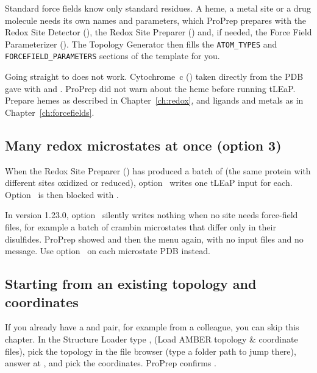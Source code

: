 Standard force fields know only standard residues. A heme, a metal site or a
drug molecule needs its own names and parameters, which ProPrep prepares with
the Redox Site Detector (), the Redox Site Preparer () and,
if needed, the Force Field Parameterizer (). The Topology Generator
then fills the \texttt{ATOM\_TYPES} and \texttt{FORCEFIELD\_PARAMETERS}
sections of the template for you.

Going straight to  does not work. Cytochrome~c () taken
directly from the PDB gave  with
 and . ProPrep did not warn
about the heme before running tLEaP. Prepare hemes as described in
Chapter~\ref{ch:redox}, and ligands and metals as in
Chapter~\ref{ch:forcefields}.

\subsection{Many redox microstates at once (option 3)}

When the Redox Site Preparer () has produced a batch of
 (the same protein with different sites oxidized or
reduced), option~ writes one tLEaP input for each. Option~ is
then blocked with .

\begin{watchout}
In version 1.23.0, option~ silently writes nothing when no site needs
force-field files, for example a batch of crambin microstates that differ only
in their disulfides. ProPrep showed 
and then the menu again, with no input files and no message. Use option~
on each microstate PDB instead.
\end{watchout}

\subsection{Starting from an existing topology and coordinates}

If you already have a  and  pair, for example from a
colleague, you can skip this chapter. In the Structure Loader type ,
 (Load AMBER topology \& coordinate files), pick the topology in the
file browser (type a folder path to jump there), answer  at
, and pick the
coordinates. ProPrep confirms .

